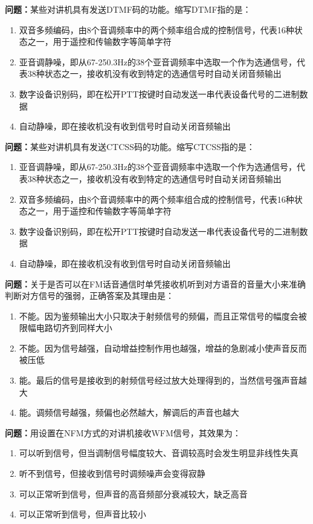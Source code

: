 \bigskip


\noindent\textbf{问题：}某些对讲机具有发送DTMF码的功能。缩写DTMF指的是：
\begin{enumerate}[label=\Alph*), leftmargin=3em]
\item 双音多频编码，由8个音调频率中的两个频率组合成的控制信号，代表16种状态之一，用于遥控和传输数字等简单字符
\item 亚音调静噪，即从67-250.3Hz的38个亚音调频率中选取一个作为选通信号，代表38种状态之一，接收机没有收到特定的选通信号时自动关闭音频输出
\item 数字设备识别码，即在松开PTT按键时自动发送一串代表设备代号的二进制数据
\item 自动静噪，即在接收机没有收到信号时自动关闭音频输出
\end{enumerate}

\bigskip


\noindent\textbf{问题：}某些对讲机具有发送CTCSS码的功能。缩写CTCSS指的是：
\begin{enumerate}[label=\Alph*), leftmargin=3em]
\item 亚音调静噪，即从67-250.3Hz的38个亚音调频率中选取一个作为选通信号，代表38种状态之一，接收机没有收到特定的选通信号时自动关闭音频输出
\item 双音多频编码，由8个音调频率中的两个频率组合成的控制信号，代表16种状态之一，用于遥控和传输数字等简单字符
\item 数字设备识别码，即在松开PTT按键时自动发送一串代表设备代号的二进制数据
\item 自动静噪，即在接收机没有收到信号时自动关闭音频输出
\end{enumerate}

\bigskip


\noindent\textbf{问题：}关于是否可以在FM话音通信时单凭接收机听到对方语音的音量大小来准确判断对方信号的强弱，正确答案及其理由是：
\begin{enumerate}[label=\Alph*), leftmargin=3em]
\item 不能。因为鉴频输出大小只取决于射频信号的频偏，而且正常信号的幅度会被限幅电路切齐到同样大小
\item 不能。因为信号越强，自动增益控制作用也越强，增益的急剧减小使声音反而被压低
\item 能。最后的信号是接收到的射频信号经过放大处理得到的，当然信号强声音越大
\item 能。调频信号越强，频偏也必然越大，解调后的声音也越大
\end{enumerate}

\bigskip


\noindent\textbf{问题：}用设置在NFM方式的对讲机接收WFM信号，其效果为：
\begin{enumerate}[label=\Alph*), leftmargin=3em]
\item 可以听到信号，但当调制信号幅度较大、音调较高时会发生明显非线性失真
\item 听不到信号，但接收到信号时调频噪声会变得寂静
\item 可以正常听到信号，但声音的高音频部分衰减较大，缺乏高音
\item 可以正常听到信号，但声音比较小
\end{enumerate}

